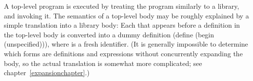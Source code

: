 A top-level program is executed by treating the program similarly to a library, and
invoking it.  The semantics of a top-level body may be roughly explained by
a simple translation into a library body: 
Each  that appears before a
definition in
the top-level body is converted into a dummy definition 
{\cf (define  (begin  (unspecified)))},
where  is a fresh identifier.
(It is generally impossible to determine which forms are 
definitions and expressions without concurrently expanding the body, so
the actual translation is somewhat more complicated; see
chapter~\ref{expansionchapter}.)

